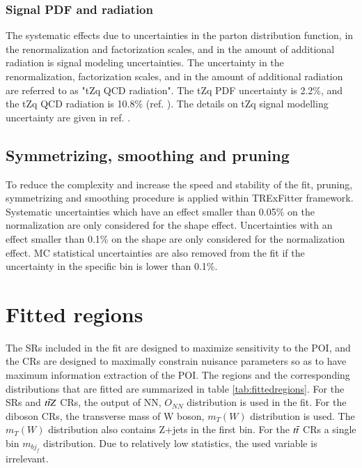  \subsubsection{Signal PDF and radiation}
 
 The systematic effects due to uncertainties in the parton distribution function, in the renormalization and factorization scales, and in the amount of additional radiation is signal modeling uncertainties. The uncertainty in the renormalization, factorization scales, and in the amount of additional radiation are referred to as "tZq QCD radiation". The tZq PDF uncertainty is 2.2\%, and the tZq QCD radiation is 10.8\% (ref. \cite{tZq2018}). The details on tZq signal modelling uncertainty are given in ref. \cite{tZq2018}.

\subsection{Symmetrizing, smoothing and pruning}

To reduce the complexity and increase the speed and stability of the fit, pruning, symmetrizing and  smoothing procedure is applied within TRExFitter framework. Systematic uncertainties which have an effect smaller than 0.05\% on the normalization are only considered for the shape effect. Uncertainties with an effect smaller than 0.1\% on the shape are only considered
for the normalization effect. MC statistical uncertainties are also removed from the fit if the uncertainty in the specific bin is lower than 0.1\%. 

\label{sec:asimov}


\section{Fitted regions}
\label{subsec:fittedregions}

The SRs included in the fit are designed to maximize sensitivity to the POI, and the CRs are designed to maximally constrain nuisance parameters so as to have maximum information extraction of the POI. The regions and the corresponding distributions that are fitted are summarized in table \ref{tab:fittedregions}. For the SRs and $t\Bar{t}Z$ CRs, the output of NN, $O_{NN}$ distribution is used in the fit. For the diboson CRs, the transverse mass of W boson, $m_{T}(W)$ distribution is used.  The $m_{T}(W)$ distribution also contains Z+jets in the first bin. For the $t\Bar{t}$ CRs a single bin $m_{bj_{f}}$ distribution. Due to relatively low statistics, the used variable is irrelevant.

